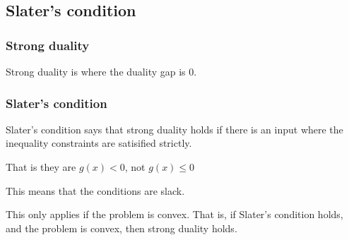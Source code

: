 
\subsection{Slater's condition}

\subsubsection{Strong duality}

Strong duality is where the duality gap is \(0\).
\subsubsection{Slater's condition}

Slater's condition says that strong duality holds if there is an input where the inequality constraints are satisified strictly.

That is they are \(g(x)<0\), not \(g(x)\le 0\)

This means that the conditions are slack.

This only applies if the problem is convex. That is, if Slater's condition holds, and the problem is convex, then strong duality holds.

